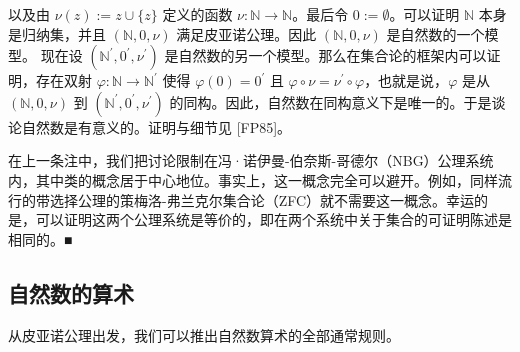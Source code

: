 \begin{remark}
\begin{items}
以及由 $ \nu(z) := z \cup \{z\} $ 定义的函数 $ \nu: \mathbb{N} \to \mathbb{N} $。最后令 $ 0 := \emptyset $。可以证明 $ \mathbb{N} $ 本身是归纳集，并且 $ (\mathbb{N}, 0, \nu) $ 满足皮亚诺公理。因此 $ (\mathbb{N}, 0, \nu) $ 是自然数的一个模型。
现在设 $(\mathbb{N}^{\prime}, 0^{\prime}, \nu^{\prime})$ 是自然数的另一个模型。那么在集合论的框架内可以证明，存在双射 $\varphi: \mathbb{N} \to \mathbb{N}^{\prime}$ 使得 $\varphi(0) = 0^{\prime}$ 且 $\varphi \circ \nu = \nu^{\prime} \circ \varphi$，也就是说，$\varphi$ 是从 $(\mathbb{N}, 0, \nu)$ 到 $(\mathbb{N}^{\prime}, 0^{\prime}, \nu^{\prime})$ 的同构。因此，自然数在同构意义下是唯一的。于是谈论自然数是有意义的。证明与细节见 [FP85]。

\item

在上一条注中，我们把讨论限制在冯·诺伊曼-伯奈斯-哥德尔（NBG）公理系统内，其中类的概念居于中心地位。事实上，这一概念完全可以避开。例如，同样流行的带选择公理的策梅洛-弗兰克尔集合论（ZFC）就不需要这一概念。幸运的是，可以证明这两个公理系统是等价的，即在两个系统中关于集合的可证明陈述是相同的。■

\end{items}

\end{remark}

\subsection*{自然数的算术}

从皮亚诺公理出发，我们可以推出自然数算术的全部通常规则。

